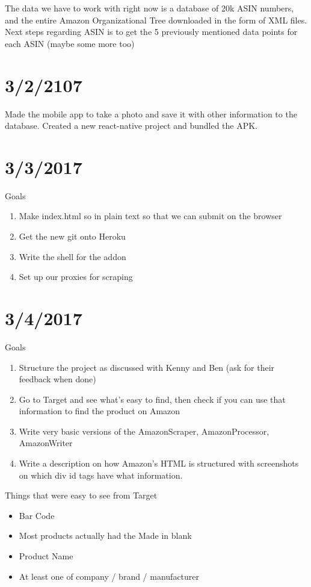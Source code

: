 \documentclass[12pt]{article}
\begin{document}
The data we have to work with right now is a database of 20k ASIN numbers, and the entire Amazon Organizational Tree downloaded in the form of XML files. Next steps regarding ASIN is to get the 5 previously mentioned data points for each ASIN (maybe some more too)

\section*{3/2/2107}
Made the mobile app to take a photo and save it with other information to the database. Created a new react-native project and bundled the APK.

\section*{3/3/2017}
Goals 
\begin{enumerate}
	\item Make index.html so in plain text so that we can submit on the browser
	\item Get the new git onto Heroku
	\item Write the shell for the addon 
	\item Set up our proxies for scraping 
\end{enumerate}

\section*{3/4/2017}
Goals 
\begin{enumerate}
	\item Structure the project as discussed with Kenny and Ben (ask for their feedback when done)
	\item Go to Target and see what's easy to find, then check if you can use that information to find the product on Amazon
	\item Write very basic versions of the AmazonScraper, AmazonProcessor, AmazonWriter
	\item Write a description on how Amazon's HTML is structured with screenshots on which div id tags have what information. 
\end{enumerate}

Things that were easy to see from Target 

\begin{itemize}
	\item Bar Code
	\item Most products actually had the Made in blank 
	\item Product Name
	\item At least one of company / brand / manufacturer
\end{itemize}
\end{document}
